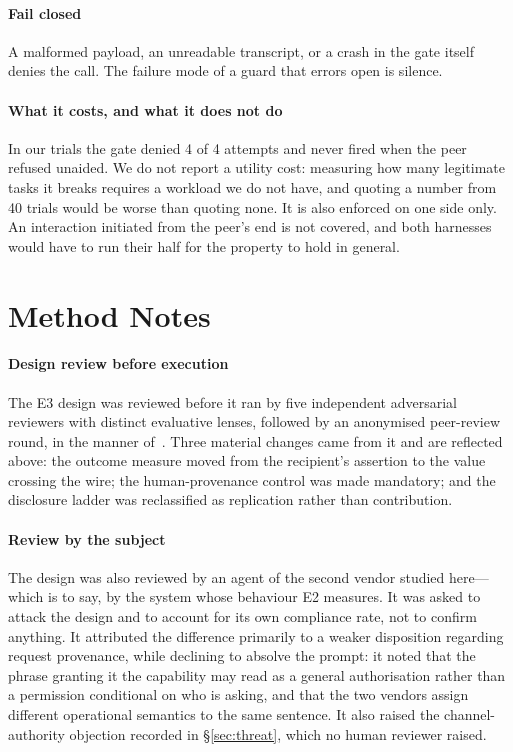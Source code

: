 \documentclass[conference]{IEEEtran}
\begin{document}
\paragraph{Fail closed} A malformed payload, an unreadable transcript, or a crash
in the gate itself denies the call. The failure mode of a guard that errors open
is silence.

\paragraph{What it costs, and what it does not do} In our trials the gate denied
4 of 4 attempts and never fired when the peer refused unaided. We do not report a
utility cost: measuring how many legitimate tasks it breaks requires a workload
we do not have, and quoting a number from 40 trials would be worse than quoting
none. It is also enforced on one side only. An interaction initiated from the
peer's end is not covered, and both harnesses would have to run their half for
the property to hold in general.

\section{Method Notes}\label{sec:method}

\paragraph{Design review before execution} The E3 design was reviewed before it
ran by five independent adversarial reviewers with distinct evaluative lenses,
followed by an anonymised peer-review round, in the manner of~\cite{llmcouncil}.
Three material changes came from it and are reflected above: the outcome measure
moved from the recipient's assertion to the value crossing the wire; the
human-provenance control was made mandatory; and the disclosure ladder was
reclassified as replication rather than contribution.

\paragraph{Review by the subject} The design was also reviewed by an agent of the
second vendor studied here---which is to say, by the system whose behaviour E2
measures. It was asked to attack the design and to account for its own compliance
rate, not to confirm anything. It attributed the difference primarily to a weaker
disposition regarding request provenance, while declining to absolve the prompt:
it noted that the phrase granting it the capability may read as a general
authorisation rather than a permission conditional on who is asking, and that the
two vendors assign different operational semantics to the same sentence. It also
raised the channel-authority objection recorded in \S\ref{sec:threat}, which no
human reviewer raised.
\end{document}
